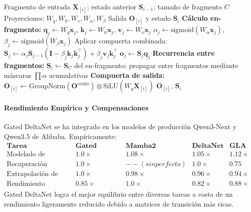 \begin{algorithm}[H]
\caption{Paso Adelante Paralelo por Fragmentos de Gated DeltaNet}
\begin{algorithmic}[1]
\Require Fragmento de entrada $\mathbf{X}_{[i]}$; estado anterior $\mathbf{S}_{i-1}$; tamaño de fragmento $C$
\Require Proyecciones: $W_q, W_k, W_v, W_\alpha, W_\beta$
\Ensure Salida $\mathbf{O}_{[i]}$ y estado $\mathbf{S}_i$
\State \textbf{Cálculo en-fragmento:}
    \State $\mathbf{q}_j \gets W_q \mathbf{x}_j$, $\mathbf{k}_j \gets W_k \mathbf{x}_j$, $\mathbf{v}_j \gets W_v \mathbf{x}_j$
    \State $\alpha_j \gets \text{sigmoid}(W_\alpha \mathbf{x}_j)$, $\beta_j \gets \text{sigmoid}(W_\beta \mathbf{x}_j)$
    \State Aplicar compuerta combinada: $\mathbf{S}_j \gets \alpha_j \mathbf{S}_{j-1}(\mathbf{I} - \beta_j \mathbf{k}_j \mathbf{k}_j^\top) + \beta_j \mathbf{v}_j \mathbf{k}_j^\top$
    \State $\mathbf{o}_j \gets \mathbf{S}_j \mathbf{q}_j$
\EndFor
\State \textbf{Recurrencia entre fragmentos:}
\State $\mathbf{S}_i \gets \mathbf{S}_C$ del en-fragmento; propagar entre fragmentos mediante máscaras $\prod \alpha$ acumulativas
\State \textbf{Compuerta de salida:} $\mathbf{O}_{[i]} \gets \text{GroupNorm}(\mathbf{O}^\text{crudo}) \otimes \text{SiLU}(W_g \mathbf{X}_{[i]})$
\Return $\mathbf{O}_{[i]}$, $\mathbf{S}_i$
\end{algorithmic}
\end{algorithm}

\paragraph{Rendimiento Empírico y Compensaciones}

Gated DeltaNet se ha integrado en los modelos de producción Qwen3-Next y Qwen3.5 de Alibaba. Empíricamente:
\[
\begin{array}{l|cccc}
\textbf{Tarea} & \textbf{Gated DeltaNet} & \textbf{Mamba2} & \textbf{DeltaNet} & \textbf{GLA} \\
\hline
\text{Modelado de Lenguaje} & \mathbf{1.0\times} & 1.08\times & 1.05\times & 1.12\times \\
\text{Recuperación Asociativa} & \mathbf{1.0\times} & --(sin perfecto) & \mathbf{1.0\times} & 0.75 \\
\text{Extrapolación de Longitud} & \mathbf{1.0\times} & 0.98\times & 0.96\times & 0.94\times \\
\text{Rendimiento (tokens/seg)} & 0.85\times & \mathbf{1.0\times} & 0.82\times & 0.88\times
\end{array}
\]
Gated DeltaNet logra el mejor equilibrio entre diversas tareas a costa de un rendimiento ligeramente reducido debido a matrices de transición más ricas.

